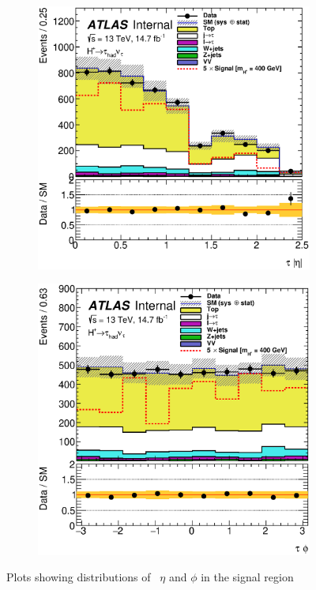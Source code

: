 \begin{figure}[!h]
\begin{subfigure}{0.5\textwidth}
   \includegraphics[width=\textwidth]{figures/tauEta_SR.eps}
\end{subfigure}
\begin{subfigure}{0.5\textwidth}
   \includegraphics[width=\textwidth]{figures/tauPhi_SR.eps}
\end{subfigure}
\caption{Plots showing distributions of \tauvis\ $\eta$ and $\phi$ in the signal region}
\label{fig:secSRb}
\end{figure}

